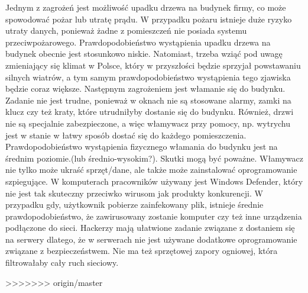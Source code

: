 Jednym z zagrożeń jest możliwość upadku drzewa na budynek firmy, co może spowodować pożar lub utratę prądu. W przypadku pożaru istnieje duże ryzyko utraty danych, ponieważ żadne z pomieszczeń nie posiada systemu przeciwpożarowego.  Prawdopodobieństwo wystąpienia upadku drzewa na budynek obecnie jest stosunkowo niskie. Natomiast, trzeba wziąć pod uwagę zmieniający się klimat w Polsce, który w przyszłości będzie sprzyjał powstawaniu silnych wiatrów, a tym samym prawdopodobieństwo wystąpienia tego zjawiska będzie coraz większe.
\newline Następnym zagrożeniem jest włamanie się do budynku. Zadanie nie jest trudne, ponieważ w oknach nie są stosowane alarmy, zamki na klucz czy też kraty, które utrudniłyby dostanie się do budynku. Również, drzwi nie są specjalnie zabezpieczone, a więc włamywacz przy pomocy, np. wytrychu jest w stanie w łatwy sposób dostać się do każdego pomieszczenia. Prawdopodobieństwo wystąpienia fizycznego włamania do budynku jest na średnim poziomie.(lub średnio-wysokim?). Skutki mogą być poważne. Włamywacz nie tylko może ukraść sprzęt/dane, ale także może zainstalować oprogramowanie szpiegujące.
\newline W komputerach pracowników używany jest Windows Defender, który nie jest tak skuteczny przeciwko wirusom jak produkty konkurencji. W przypadku gdy, użytkownik pobierze zainfekowany plik, istnieje średnie prawdopodobieństwo, że zawirusowany zostanie komputer czy też inne urządzenia podłączone do sieci.
\newline Hackerzy mają ułatwione zadanie związane z dostaniem się na serwery dlatego, że w serwerach nie jest używane dodatkowe oprogramowanie związane z bezpieczeństwem. Nie ma też sprzętowej zapory ogniowej, która filtrowałaby cały ruch sieciowy.	

>>>>>>> origin/master
